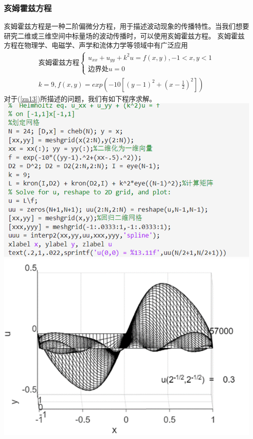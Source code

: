 \documentclass[12pt]{ctexart}
\numberwithin{equation}{section} %
\begin{document}
\subsubsection{亥姆霍兹方程}
亥姆霍兹方程是一种二阶偏微分方程，用于描述波动现象的传播特性。当我们想要研究二维或三维空间中标量场的波动传播时，可以使用亥姆霍兹方程。
亥姆霍兹方程在物理学、电磁学、声学和流体力学等领域中有广泛应用
\begin{equation}\label{zn13}
\begin{split}
        \text{亥姆霍兹方程}\begin{cases}
u_{xx}+u_{yy}+k^2u=f(x,y),-1<x,y<1\\
    \text{边界处}u=0
\end{cases}\\
k=9,f(x,y)=exp(-10[(y-1)^2+(x-\frac{1}{2})^2])
\end{split}
\end{equation}
对于(\ref{zn13})所描述的问题，我们有如下程序求解。\\
\includegraphics[width=1\textwidth]{程序图6.png}\\
\includegraphics[width=1\textwidth]{运行结果图5.png}
\end{document}
